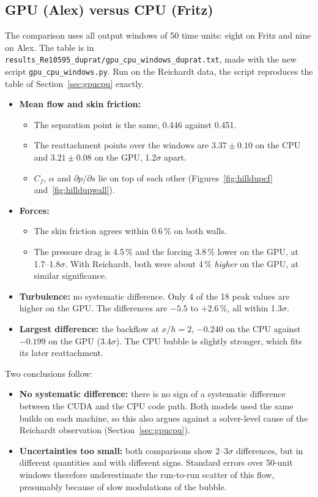 \documentclass[11pt,a4paper]{article}
\newcommand{\code}[1]{\texttt{#1}}
\newcommand{\dpds}{\partial p/\partial s}
\begin{document}
\subsection{GPU (Alex) versus CPU (Fritz)}
\label{sec:hilldup-gpucpu}

The comparison uses all output windows of 50 time units: eight on Fritz and
nine on Alex. The table is in
\code{results\_Re10595\_duprat/gpu\_cpu\_windows\_duprat.txt}, made with the
new script \code{gpu\_cpu\_windows.py}. Run on the Reichardt data, the script
reproduces the table of Section~\ref{sec:gpucpu} exactly.

\begin{itemize}
  \item \textbf{Mean flow and skin friction:}
    \begin{itemize}
      \item The separation point is the same, 0.446 against 0.451.
      \item The reattachment points over the windows are $3.37 \pm 0.10$ on
        the CPU and $3.21 \pm 0.08$ on the GPU, 1.2$\sigma$ apart.
      \item $C_f$, $\alpha$ and $\dpds$ lie on top of each other
        (Figures~\ref{fig:hilldupcf} and~\ref{fig:hilldupwall}).
    \end{itemize}
  \item \textbf{Forces:}
    \begin{itemize}
      \item The skin friction agrees within 0.6\,\% on both walls.
      \item The pressure drag is 4.5\,\% and the forcing 3.8\,\% lower on
        the GPU, at 1.7--1.8$\sigma$. With Reichardt, both were about 4\,\%
        \emph{higher} on the GPU, at similar significance.
    \end{itemize}
  \item \textbf{Turbulence:} no systematic difference. Only 4 of the 18
    peak values are higher on the GPU. The differences are $-5.5$ to
    $+2.6\,\%$, all within 1.3$\sigma$.
  \item \textbf{Largest difference:} the backflow at $x/h = 2$, $-0.240$ on
    the CPU against $-0.199$ on the GPU (3.4$\sigma$). The CPU bubble is
    slightly stronger, which fits its later reattachment.
\end{itemize}

\noindent Two conclusions follow:
\begin{itemize}
  \item \textbf{No systematic difference:} there is no sign of a systematic
    difference between the CUDA and the CPU code path. Both models used the
    same builds on each machine, so this also argues against a solver-level
    cause of the Reichardt observation (Section~\ref{sec:gpucpu}).
  \item \textbf{Uncertainties too small:} both comparisons show 2--3$\sigma$
    differences, but in different quantities and with different signs.
    Standard errors over 50-unit windows therefore underestimate the
    run-to-run scatter of this flow, presumably because of slow modulations
    of the bubble.
\end{itemize}
\end{document}
